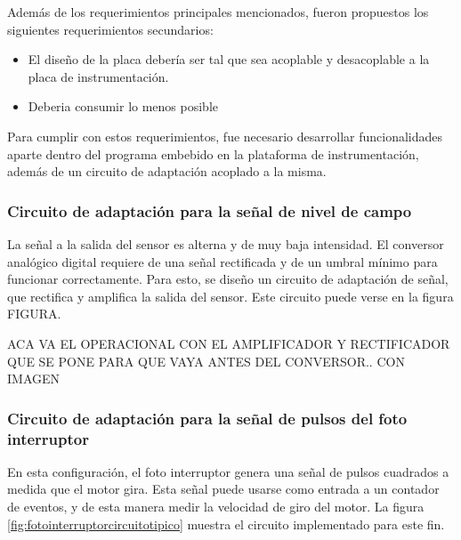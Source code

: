 Además de los requerimientos principales mencionados, fueron propuestos los siguientes requerimientos secundarios:

\begin{itemize}
  \item El diseño de la placa debería ser tal que sea acoplable y desacoplable a la placa de instrumentación.
  \item Deberia consumir lo menos posible
\end{itemize}

Para cumplir con estos requerimientos, fue necesario desarrollar funcionalidades aparte dentro del programa embebido en la plataforma de instrumentación, además de un circuito de adaptación acoplado a la misma.

\subsubsection{Circuito de adaptación para la señal de nivel de campo} %
\label{it6:ssub:circuito_de_adaptacion_para_la_señal_de_nivel_de_campo}

La señal a la salida del sensor es alterna y de muy baja intensidad. El conversor analógico digital requiere de una señal rectificada y de un umbral mínimo para funcionar correctamente. Para esto, se diseño un circuito de adaptación de señal, que rectifica y amplifica la salida del sensor. Este circuito puede verse en la figura FIGURA.  

ACA VA EL OPERACIONAL CON EL AMPLIFICADOR Y RECTIFICADOR QUE SE PONE PARA QUE VAYA ANTES DEL CONVERSOR.. CON IMAGEN




\subsubsection{Circuito de adaptación para la señal de pulsos del foto interruptor} %
\label{it6:ssub:circuito_de_adaptacion_para_la_señal_de_pulsos_del_fotointerruptor}


En esta configuración, el foto interruptor genera una señal de pulsos cuadrados a medida que el motor gira. Esta señal puede usarse como entrada a un contador de eventos, y de esta manera medir la velocidad de giro del motor. La figura \ref{fig:fotointerruptorcircuitotipico} muestra el circuito implementado para este fin. 

